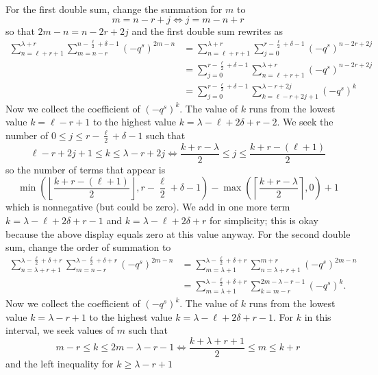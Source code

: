 \begin{itemize}
  \ii For the first double sum, change the summation for $m$ to
  \[ m = n-r + j \iff j = m - n + r \]
  so that $2m - n = n - 2r + 2j$
  and the first double sum rewrites as
  \begin{align*}
    \sum_{n=\ell+r+1}^{\lambda+r} \sum_{m=n-r}^{n-\frac{\ell}{2}+\delta-1} (-q^s)^{2m-n}
    &= \sum_{n=\ell+r+1}^{\lambda+r}
      \sum_{j=0}^{r-\frac{\ell}{2}+\delta-1} (-q^s)^{n-2r+2j} \\
    &= \sum_{j=0}^{r-\frac{\ell}{2}+\delta-1} \sum_{n=\ell+r+1}^{\lambda+r}
      (-q^s)^{n-2r+2j} \\
    &= \sum_{j=0}^{r-\frac{\ell}{2}+\delta-1}
    \sum_{k=\ell-r+2j+1}^{\lambda-r+2j} (-q^s)^k
  \end{align*}
  Now we collect the coefficient of $(-q^s)^k$.
  The value of $k$ runs from the lowest value $k = \ell-r+1$
  to the highest value $k = \lambda - \ell + 2 \delta + r - 2$.
  We seek the number of $0 \le j \le r-\frac{\ell}{2}+\delta-1$ such that
  \[ \ell - r + 2j + 1 \le k \le \lambda - r + 2j
    \iff \frac{k + r - \lambda}{2} \le j \le \frac{k + r - (\ell + 1)}{2} \]
  so the number of terms that appear is
  \[
    \min\left( \left\lfloor \frac{k + r - (\ell + 1)}{2} \right\rfloor, r - \frac{\ell}{2} + \delta - 1 \right)
    - \max\left( \left\lceil \frac{k + r -\lambda}{2} \right\rceil, 0 \right)
    + 1
  \]
  which is nonnegative (but could be zero).
  We add in one more term $k = \lambda - \ell + 2 \delta + r - 1$
  and $k = \lambda - \ell + 2 \delta + r$
  for simplicity;
  this is okay because the above display equals zero at this value anyway.
  \ii For the second double sum, change the order of summation to
  \begin{align*}
    \sum_{n=\lambda+r+1}^{\lambda-\frac{\ell}{2}+\delta+r}
      \sum_{m=n-r}^{\lambda-\frac{\ell}{2}+\delta+r} (-q^s)^{2m-n}
    &= \sum_{m=\lambda+1}^{\lambda-\frac{\ell}{2}+\delta+r}
      \sum_{n=\lambda+r+1}^{m+r} (-q^s)^{2m-n} \\
    &= \sum_{m=\lambda+1}^{\lambda-\frac{\ell}{2}+\delta+r}
      \sum_{k=m-r}^{2m-\lambda-r-1} (-q^s)^k.
  \end{align*}
  Now we collect the coefficient of $(-q^s)^k$.
  The value of $k$ runs from the lowest value $k = \lambda - r + 1$
  to the highest value $k = \lambda-\ell+2\delta+r-1$.
  For $k$ in this interval, we seek values of $m$ such that
  \[ m - r \le k \le 2 m - \lambda - r - 1
    \iff \frac{k + \lambda + r + 1}{2} \le m \le k + r \]
  and the left inequality for $k \ge \lambda - r + 1$

\end{itemize}
